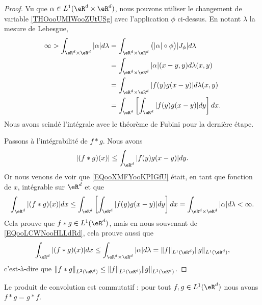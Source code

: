 \begin{proof}
	Vu que \( \alpha\in L^1(\eR^d\times \eR^d)\), nous pouvons utiliser le changement de variable \ref{THOooUMIWooZUtUSg} avec l'application \( \phi\) ci-dessus. En notant \( \lambda\) la mesure de Lebesgue,
	\begin{subequations}
		\begin{align}
			\infty>\int_{\eR^d\times \eR^d}| \alpha |d\lambda & =\int_{\eR^d\times \eR^d}\big( | \alpha |\circ\phi \big)| J_{\phi} |d\lambda \\
			                                                  & =\int_{\eR^d\times \eR^d}| \alpha |(x-y,y)d\lambda(x,y)                      \\
			                                                  & =\int_{\eR^d\times \eR^d}| f(y)g(x-y) |d\lambda(x,y)                         \\
			                                                  & =\int_{\eR^d}\left[ \int_{\eR^d}| f(y)g(x-y) |dy \right]dx.
		\end{align}
	\end{subequations}
	Nous avons scindé l'intégrale avec le théorème de Fubini pour la dernière étape.

	Passons à l'intégrabilité de \( f*g\). Nous avons
	\begin{equation}        \label{EQooXMFYooKPIGfU}
		| (f*g)(x) |\leq \int_{\eR^d}| f(y)g(x-y) |dy.
	\end{equation}
	Or nous venons de voir que \eqref{EQooXMFYooKPIGfU} était, en tant que fonction de \( x\), intégrable sur \( \eR^d\) et que
	\begin{equation}
		\int_{\eR^d}| (f*g)(x) |dx\leq\int_{\eR^d}\left[ \int_{\eR^d}| f(y)g(x-y) |dy \right]dx=\int_{\eR^d\times \eR^d}| \alpha |d\lambda<\infty.
	\end{equation}
	Cela prouve que \( f*g\in L^1(\eR^d)\), mais en nous souvenant de \eqref{EQooLCWNooHLLdRd}, cela prouve aussi que
	\begin{equation}
		\int_{\eR^d}| (f*g)(x) |dx\leq\int_{\eR^d\times \eR^d}| \alpha |d\lambda=\| f \|_{L^1(\eR^d)}\| g \|_{L^1(\eR^d)},
	\end{equation}
	c'est-à-dire que \( \| f*g \|_{L^2(\eR^d)}\leq \| f \|_{L^1(\eR^d)}\| g \|_{L^1(\eR^d)}\).
\end{proof}

\begin{lemma}       \label{LEMooMRWZooHjrnHD}
	Le produit de convolution est commutatif : pour tout \( f,g\in L^1(\eR^d)\) nous avons \( f*g=g*f\).
\end{lemma}

